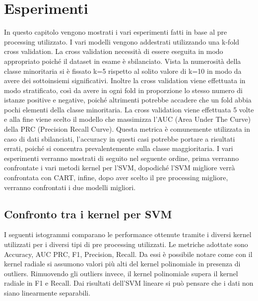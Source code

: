 \chapter{Esperimenti}
In questo capitolo vengono mostrati i vari esperimenti fatti in base al pre processing utilizzato. 
I vari modelli vengono addestrati utilizzando una k-fold cross validation.
La cross validation necessità di essere eseguita in modo appropriato poiché il dataset in esame è sbilanciato.
Vista la numerosità della classe minoritaria si è fissato k=5 rispetto al solito valore di k=10 in modo da avere dei sottoinsiemi significativi.
Inoltre la cross validation viene effettuata in modo stratificato, così da avere in ogni fold in proporzione lo stesso numero di istanze positive e negative, poiché altrimenti potrebbe accadere che un fold abbia pochi elementi della classe minoritaria.
La cross validation viene effettuata 5 volte e alla fine viene scelto il modello che massimizza l'AUC (Area Under The Curve) della PRC (Precision Recall Curve). Questa metrica è comunemente utilizzata in caso di dati sbilanciati, l'accuracy in questi casi potrebbe portare a risultati errati, poiché si concentra prevalentemente sulla classe maggioritaria.
I vari esperimenti verranno mostrati di seguito nel seguente ordine, prima verranno confrontate i vari metodi kernel per l'SVM, dopodiché l'SVM migliore verrà confrontata con CART, infine, dopo aver scelto il pre processing migliore, verranno confrontati i due modelli migliori.

\newpage

\section{Confronto tra i kernel per SVM}
I seguenti istogrammi comparano le performance ottenute tramite i diversi kernel utilizzati per i diversi tipi di pre processing utilizzati.
Le metriche adottate sono Accuracy, AUC PRC, F1, Precision, Recall.
Da essi è possibile notare come con il kernel radiale si assumono valori più alti del kernel polinomiale in presenza di outliers.
Rimuovendo gli outliers invece, il kernel polinomiale supera il kernel radiale in F1 e Recall. 
Dai risultati dell'SVM lineare si può pensare che i dati non siano linearmente separabili.

